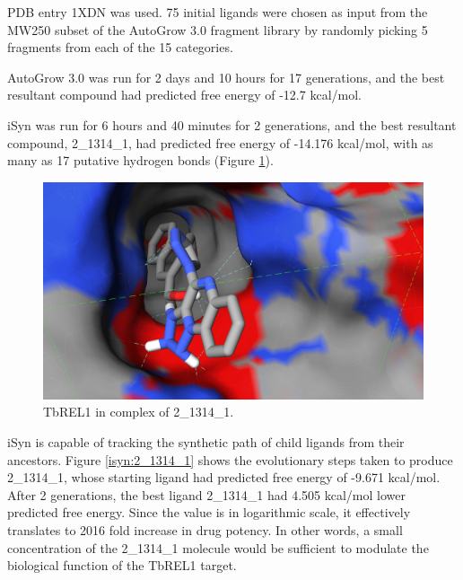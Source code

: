 PDB entry 1XDN was used. 75 initial ligands were chosen as input from the MW250 subset of the AutoGrow 3.0 fragment library by randomly picking 5 fragments from each of the 15 categories.

AutoGrow 3.0 was run for 2 days and 10 hours for 17 generations, and the best resultant compound had predicted free energy of -12.7 kcal/mol.

iSyn was run for 6 hours and 40 minutes for 2 generations, and the best resultant compound, 2\_1314\_1, had predicted free energy of -14.176 kcal/mol, with as many as 17 putative hydrogen bonds (Figure \ref{isyn:1XDN}).

\begin{figure}
\begin{center}
\includegraphics[width=\linewidth]{../isyn/1XDN.png}
\end{center}
\caption{TbREL1 in complex of 2\_1314\_1.}
\label{isyn:1XDN}
\end{figure}

iSyn is capable of tracking the synthetic path of child ligands from their ancestors. Figure \ref{isyn:2_1314_1} shows the evolutionary steps taken to produce 2\_1314\_1, whose starting ligand had predicted free energy of -9.671 kcal/mol. After 2 generations, the best ligand 2\_1314\_1 had 4.505 kcal/mol lower predicted free energy. Since the value is in logarithmic scale, it effectively translates to 2016 fold increase in drug potency. In other words, a small concentration of the 2\_1314\_1 molecule would be sufficient to modulate the biological function of the TbREL1 target.

